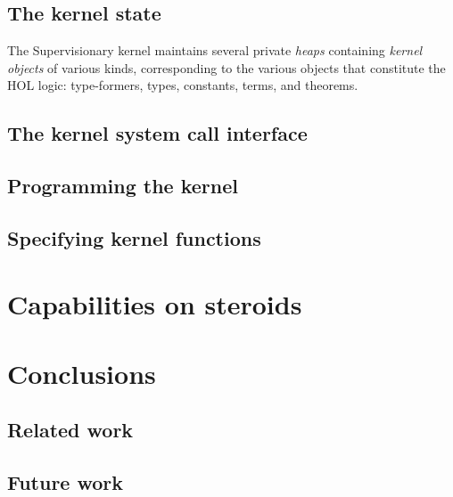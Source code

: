 \documentclass[a4paper, UKenglish, cleveref, autoref, thm-restate]{lipics-v2021}
\begin{document}
\subsection{The kernel state}

The Supervisionary kernel maintains several private \emph{heaps} containing \emph{kernel objects} of various kinds, corresponding to the various objects that constitute the HOL logic: type-formers, types, constants, terms, and theorems.

\subsection{The kernel system call interface}

\subsection{Programming the kernel}

\subsection{Specifying kernel functions}

\section{Capabilities on steroids}
\label{sect.capabilities.on.steroids}

\section{Conclusions}
\label{sect.conclusions}

\subsection{Related work}

\subsection{Future work}
\end{document}
